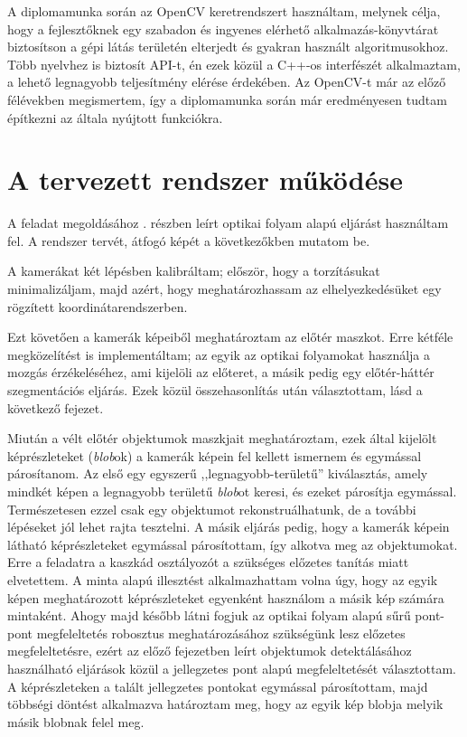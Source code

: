 A diplomamunka során az OpenCV \cite{opencv} keretrendszert használtam, melynek célja, hogy a fejlesztőknek egy szabadon és ingyenes elérhető alkalmazás-könyvtárat biztosítson a gépi látás területén elterjedt és gyakran használt algoritmusokhoz. Több nyelvhez is biztosít API-t, én ezek közül a C++-os interfészét alkalmaztam, a lehető legnagyobb teljesítmény elérése érdekében. Az OpenCV-t már az előző félévekben megismertem, így a diplomamunka során már eredményesen tudtam építkezni az általa nyújtott funkciókra.

\section{A tervezett rendszer működése}

A feladat megoldásához . részben leírt optikai folyam alapú eljárást használtam fel. A rendszer tervét, átfogó képét a következőkben mutatom be.

A kamerákat két lépésben kalibráltam; először, hogy a torzításukat minimalizáljam, majd azért, hogy meghatározhassam az elhelyezkedésüket egy rögzített koordinátarendszerben.

Ezt követően a kamerák képeiből meghatároztam az előtér maszkot. Erre kétféle megközelítést is implementáltam; az egyik az optikai folyamokat használja a mozgás érzékeléséhez, ami kijelöli az előteret, a másik pedig egy előtér-háttér szegmentációs eljárás. Ezek közül összehasonlítás után választottam, lásd a következő fejezet.

{\color{blue}
Miután a vélt előtér objektumok maszkjait meghatároztam, ezek által kijelölt képrészleteket (\textit{blob}ok) a kamerák képein fel kellett ismernem és egymással párosítanom. Az első egy egyszerű ,,legnagyobb-területű'' kiválasztás, amely mindkét képen a legnagyobb területű \textit{blob}ot keresi, és ezeket párosítja egymással. Természetesen ezzel csak egy objektumot rekonstruálhatunk, de a további lépéseket jól lehet rajta tesztelni. A másik eljárás pedig, hogy a kamerák képein látható képrészleteket egymással párosítottam, így alkotva meg az objektumokat. Erre a feladatra a kaszkád osztályozót a szükséges előzetes tanítás miatt elvetettem. A minta alapú illesztést alkalmazhattam volna úgy, hogy az egyik képen meghatározott képrészleteket egyenként használom a másik kép számára mintaként. Ahogy majd később látni fogjuk az optikai folyam alapú sűrű pont-pont megfeleltetés robosztus meghatározásához szükségünk lesz előzetes megfeleltetésre, ezért az előző fejezetben leírt objektumok detektálásához használható eljárások közül a jellegzetes pont alapú megfeleltetését választottam. A képrészleteken a talált jellegzetes pontokat egymással párosítottam, majd többségi döntést alkalmazva határoztam meg, hogy az egyik kép blobja melyik másik blobnak felel meg.

}

